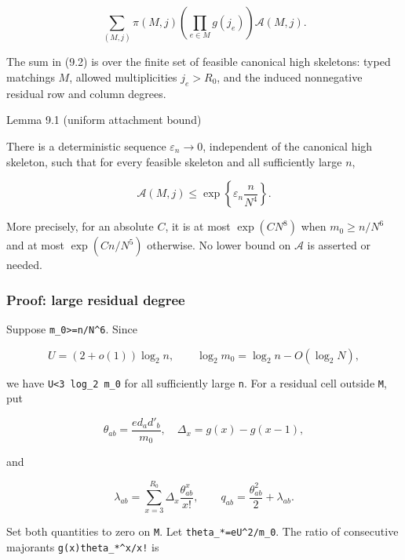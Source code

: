 \documentclass[
  11pt,
  a4paper,
]{article}
\begin{document}
\[
 \sum_{(M,j)}\pi(M,j)\left(\prod_{e\in M}g(j_e)\right)
 \mathcal A(M,j).                                       \tag{9.2}
\]

The sum in (9.2) is over the finite set of feasible canonical high
skeletons: typed matchings \(M\), allowed multiplicities \(j_e>R_0\),
and the induced nonnegative residual row and column degrees.

{}
\label{lemma-9.1-uniform-attachment-bound}
\begin{lemmabox}{Lemma 9.1 (uniform attachment bound)}

There is a deterministic sequence \(\varepsilon_n\to0\), independent of
the canonical high skeleton, such that for every feasible skeleton and
all sufficiently large \(n\),

\[
 \mathcal A(M,j)\le
 \exp\!\left\{\varepsilon_n\frac n{N^4}\right\}.       \tag{9.3}
\]

More precisely, for an absolute \(C\), it is at most \(\exp(CN^8)\) when
\(m_0\ge n/N^6\) and at most \(\exp(Cn/N^5)\) otherwise. No lower bound
on \(\mathcal A\) is asserted or needed.

\end{lemmabox}

\subsubsection{Proof: large residual
degree}\label{proof-large-residual-degree}

Suppose \texttt{m\_0\textgreater{}=n/N\^{}6}. Since

\[
 U=(2+o(1))\log_2n,\qquad
 \log_2m_0=\log_2n-O(\log_2N),                           \tag{9.4}
\]

we have \texttt{U\textless{}3\ log\_2\ m\_0} for all sufficiently large
\texttt{n}. For a residual cell outside \texttt{M}, put

\[
 \theta_{ab}=\frac{e d_ad'_b}{m_0},\quad
 \Delta_x=g(x)-g(x-1),                                  \tag{9.5}
\]

and

\[
 \lambda_{ab}=\sum_{x=3}^{R_0}\Delta_x
                    \frac{\theta_{ab}^x}{x!},\qquad
 q_{ab}=\frac{\theta_{ab}^2}{2}+\lambda_{ab}.            \tag{9.6}
\]

Set both quantities to zero on \texttt{M}. Let
\texttt{theta\_*=eU\^{}2/m\_0}. The ratio of consecutive majorants
\texttt{g(x)theta\_*\^{}x/x!} is
\end{document}

